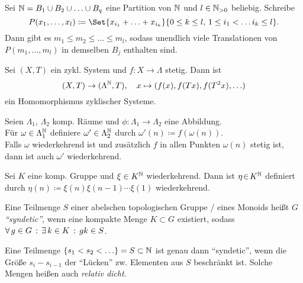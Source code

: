 \documentclass{cheat-sheet}
\begin{document}
\begin{lem}[Hilbert]
  Sei $\mathbb{N} = B_1 \cup B_2 \cup \ldots \cup B_q$ eine Partition von $\mathbb{N}$ und $l \in \mathbb{N}_{>0}$ beliebig.
  Schreibe
  \[ P(x_1, \ldots, x_l) \coloneqq \Set{ x_{i_1} + \ldots + x_{i_k} }{0 \leq k \leq l, \, 1 \leq i_1 < \ldots i_k \leq l}. \]
  Dann gibt es $m_1 \leq m_2 \leq \ldots \leq m_l$, sodass unendlich viele Translationen von $P(m_1, \ldots, m_l)$ in demselben $B_j$ enthalten sind.
\end{lem}

\begin{bem}
  Sei $(X, T)$ ein zykl. System und $f : X \to \Lambda$ stetig. Dann ist
  \[
    (X, T) \to (\Lambda^{\mathbb{N}}, T), \quad
    x \mapsto (f(x), f(Tx), f(T^2x), \ldots)
  \]
  ein Homomorphismus zyklischer Systeme.

\end{bem}

\begin{thm}
  Seien $\Lambda_1$, $\Lambda_2$ komp. Räume und $\phi : \Lambda_1 \to \Lambda_2$ eine Abbildung. \\
  Für $\omega \in \Lambda_1^{\mathbb{N}}$ definiere $\omega' \in \Lambda_2^{\mathbb{N}}$ durch $\omega'(n) \coloneqq f(\omega(n))$. \\
  Falls $\omega$ wiederkehrend ist und zusätzlich $f$ in allen Punkten $\omega(n)$ stetig ist, dann ist auch $\omega'$ wiederkehrend.
\end{thm}


\begin{prop}
  Sei $K$ eine komp. Gruppe und $\xi \in K^{\mathbb{N}}$ wiederkehrend. Dann ist $\eta \!\in\! K^{\mathbb{N}}$ definiert durch $\eta(n) \coloneqq \xi(n) \xi(n-1) \cdots \xi(1)$ wiederkehrend.
\end{prop}



\begin{defn}
  Eine Teilmenge $S$ einer abelschen topologischen Gruppe / eines Monoids heißt $G$ \emph{"`syndetic"'}, wenn eine kompakte Menge $K \subset G$ existiert, sodass $\forall \, {g \in G} \,:\, \exists \, {k \in K} \,:\, gk \in S$.
\end{defn}

\begin{bem}
  Eine Teilmenge $\{ s_1 < s_2 < \ldots \} = S \subset \mathbb{N}$ ist genau dann "`syndetic"', wenn die Größe $s_i - s_{i-1}$ der "`Lücken"' zw. Elementen aus $S$ beschränkt ist.
  Solche Mengen heißen auch \emph{relativ dicht}.
\end{bem}
\end{document}
